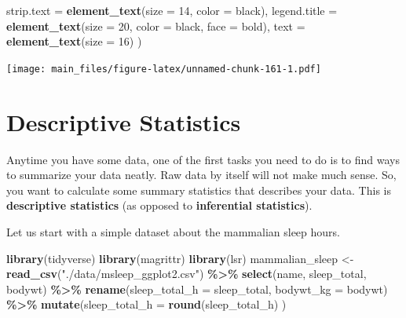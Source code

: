 \documentclass[
]{book}
\newenvironment{Shaded}{\begin{snugshade}}{\end{snugshade}}
\newcommand{\AttributeTok}[1]{\textcolor[rgb]{0.13,0.29,0.53}{#1}}
\newcommand{\DecValTok}[1]{\textcolor[rgb]{0.00,0.00,0.81}{#1}}
\newcommand{\FunctionTok}[1]{\textcolor[rgb]{0.13,0.29,0.53}{\textbf{#1}}}
\newcommand{\NormalTok}[1]{#1}
\newcommand{\OtherTok}[1]{\textcolor[rgb]{0.56,0.35,0.01}{#1}}
\newcommand{\SpecialCharTok}[1]{\textcolor[rgb]{0.81,0.36,0.00}{\textbf{#1}}}
\newcommand{\StringTok}[1]{\textcolor[rgb]{0.31,0.60,0.02}{#1}}
\begin{document}
\begin{Shaded}
\begin{Highlighting}[]
    \AttributeTok{strip.text =} \FunctionTok{element\_text}\NormalTok{(}\AttributeTok{size =} \DecValTok{14}\NormalTok{, }\AttributeTok{color =} \StringTok{\textquotesingle{}black\textquotesingle{}}\NormalTok{),}
    \AttributeTok{legend.title =} \FunctionTok{element\_text}\NormalTok{(}\AttributeTok{size =} \DecValTok{20}\NormalTok{, }\AttributeTok{color =} \StringTok{\textquotesingle{}black\textquotesingle{}}\NormalTok{, }\AttributeTok{face =} \StringTok{\textquotesingle{}bold\textquotesingle{}}\NormalTok{),}
    \AttributeTok{text =} \FunctionTok{element\_text}\NormalTok{(}\AttributeTok{size =} \DecValTok{16}\NormalTok{)}
\NormalTok{  )}
\end{Highlighting}
\end{Shaded}

\texttt{[image: main\_files/figure-latex/unnamed-chunk-161-1.pdf]}

\chapter{Descriptive Statistics}\label{descriptive-statistics}

Anytime you have some data, one of the first tasks you need to do is to find ways to summarize your data neatly. Raw data by itself will not make much sense. So, you want to calculate some summary statistics that describes your data. This is \textbf{descriptive statistics} (as opposed to \textbf{inferential statistics}).

Let us start with a simple dataset about the mammalian sleep hours.

\begin{Shaded}
\begin{Highlighting}[]
\FunctionTok{library}\NormalTok{(tidyverse)}
\FunctionTok{library}\NormalTok{(magrittr)}
\FunctionTok{library}\NormalTok{(lsr)}
\NormalTok{mammalian\_sleep }\OtherTok{\textless{}{-}} 
      \FunctionTok{read\_csv}\NormalTok{(}\StringTok{"./data/msleep\_ggplot2.csv"}\NormalTok{) }\SpecialCharTok{\%\textgreater{}\%} 
      \FunctionTok{select}\NormalTok{(name, sleep\_total, bodywt) }\SpecialCharTok{\%\textgreater{}\%}
      \FunctionTok{rename}\NormalTok{(}\AttributeTok{sleep\_total\_h =}\NormalTok{ sleep\_total, }\AttributeTok{bodywt\_kg =}\NormalTok{ bodywt) }\SpecialCharTok{\%\textgreater{}\%}
      \FunctionTok{mutate}\NormalTok{(}\AttributeTok{sleep\_total\_h =} \FunctionTok{round}\NormalTok{(sleep\_total\_h) )}
\end{Highlighting}
\end{Shaded}
\end{document}
